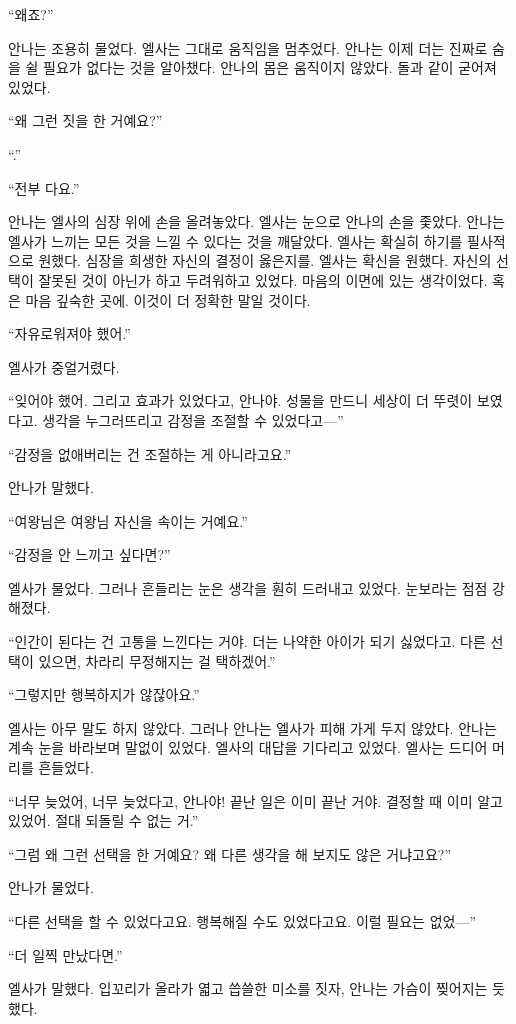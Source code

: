 ``왜죠?''

안나는 조용히 물었다. 엘사는 그대로 움직임을 멈추었다. 안나는 이제 더는 진짜로 숨을 쉴 필요가 없다는 것을 알아챘다. 안나의 몸은 움직이지 않았다. 돌과 같이 굳어져 있었다.

``왜 그런 짓을 한 거예요?''

``.''

``전부 다요.''

안나는 엘사의 심장 위에 손을 올려놓았다. 엘사는 눈으로 안나의 손을 좇았다. 안나는 엘사가 느끼는 모든 것을 느낄 수 있다는 것을 깨달았다. 엘사는 확실히 하기를 필사적으로 원했다. 심장을 희생한 자신의 결정이 옳은지를. 엘사는 확신을 원했다. 자신의 선택이 잘못된 것이 아닌가 하고 두려워하고 있었다. 마음의 이면에 있는 생각이었다. 혹은 마음 깊숙한 곳에. 이것이 더 정확한 말일 것이다.

``자유로워져야 했어.''

엘사가 중얼거렸다.

``잊어야 했어. 그리고 효과가 있었다고, 안나야. 성물을 만드니 세상이 더 뚜렷이 보였다고. 생각을 누그러뜨리고 감정을 조절할 수 있었다고—''

``감정을 없애버리는 건 조절하는 게 아니라고요.''

안나가 말했다.

``여왕님은 여왕님 자신을 속이는 거예요.''

``감정을 안 느끼고 싶다면?''

엘사가 물었다. 그러나 흔들리는 눈은 생각을 훤히 드러내고 있었다. 눈보라는 점점 강해졌다.

``인간이 된다는 건 고통을 느낀다는 거야. 더는 나약한 아이가 되기 싫었다고. 다른 선택이 있으면, 차라리 무정해지는 걸 택하겠어.''

``그렇지만 행복하지가 않잖아요.''

엘사는 아무 말도 하지 않았다. 그러나 안나는 엘사가 피해 가게 두지 않았다. 안나는 계속 눈을 바라보며 말없이 있었다. 엘사의 대답을 기다리고 있었다. 엘사는 드디어 머리를 흔들었다.

``너무 늦었어, 너무 늦었다고, 안나야! 끝난 일은 이미 끝난 거야. 결정할 때 이미 알고 있었어. 절대 되돌릴 수 없는 거.''

``그럼 왜 그런 선택을 한 거예요? 왜 다른 생각을 해 보지도 않은 거냐고요?''

안나가 물었다.

``다른 선택을 할 수 있었다고요. 행복해질 수도 있었다고요. 이럴 필요는 없었—''

``더 일찍 만났다면.''

엘사가 말했다. 입꼬리가 올라가 엷고 씁쓸한 미소를 짓자, 안나는 가슴이 찢어지는 듯했다.

